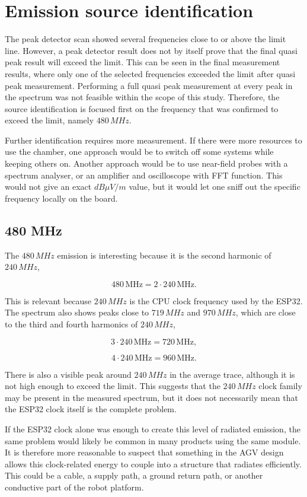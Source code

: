 \section{Emission source identification}

The peak detector scan showed several frequencies close to or above the limit line.
However, a peak detector result does not by itself prove that the final quasi peak result
will exceed the limit. This can be seen in the final measurement results, where only one
of the selected frequencies exceeded the limit after quasi peak measurement. Performing
a full quasi peak measurement at every peak in the spectrum was not feasible within the
scope of this study. Therefore, the source identification is focused first on the frequency
that was confirmed to exceed the limit, namely \(480\,MHz\).

Further identification requires more measurement. If there were more resources to use
the chamber, one approach would be to switch off some systems while keeping others on.
Another approach would be to use near-field probes with a spectrum analyser, or an
amplifier and oscilloscope with FFT function. This would not give an exact \(dB\mu V/m\)
value, but it would let one sniff out the specific frequency locally on the board.

\subsection{480 MHz}

The \(480\,MHz\) emission is interesting because it is the second harmonic of \(240\,MHz\),

\[
480\,\mathrm{MHz} = 2 \cdot 240\,\mathrm{MHz}.
\]

This is relevant because \(240\,MHz\) is the CPU clock frequency used by the ESP32. The
spectrum also shows peaks close to \(719\,MHz\) and \(970\,MHz\), which are close to the
third and fourth harmonics of \(240\,MHz\),

\[
3 \cdot 240\,\mathrm{MHz} = 720\,\mathrm{MHz},
\]

\[
4 \cdot 240\,\mathrm{MHz} = 960\,\mathrm{MHz}.
\]

There is also a visible peak around \(240\,MHz\) in the average trace, although it is not high
enough to exceed the limit. This suggests that the \(240\,MHz\) clock family may be present
in the measured spectrum, but it does not necessarily mean that the ESP32 clock itself is
the complete problem.

If the ESP32 clock alone was enough to create this level of radiated emission, the same
problem would likely be common in many products using the same module. It is therefore
more reasonable to suspect that something in the AGV design allows this clock-related
energy to couple into a structure that radiates efficiently. This could be a cable, a supply
path, a ground return path, or another conductive part of the robot platform.

